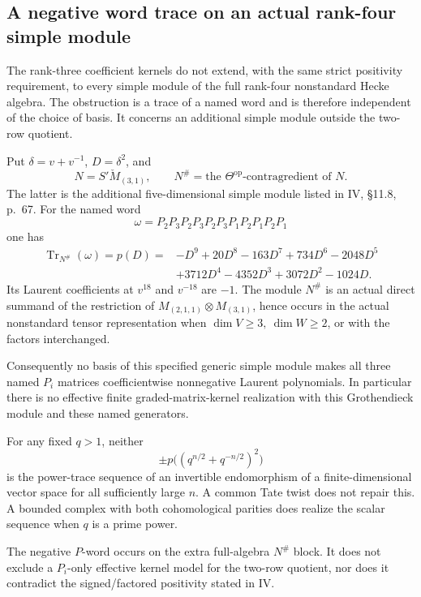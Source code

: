 \subsection{A negative word trace on an actual rank-four simple module}
The rank-three coefficient kernels do not extend, with the same
strict positivity requirement, to every simple module of the full
rank-four nonstandard Hecke algebra. The obstruction is a trace of
a named word and is therefore independent of the choice of basis.
It concerns an additional simple module outside the two-row quotient.

\begin{finding}
\label{f:rankfournegativetrace}
Put \(\delta=v+v^{-1}\), \(D=\delta^2\), and
\[
 N=S'\check M_{(3,1)},\qquad
 N^\#=\text{the }\Theta^{\mathrm{op}}\text{-contragredient of }N.
\]
The latter is the additional five-dimensional simple module listed
in IV, \S11.8, p.~67. For the named word
\[
 \omega=P_2P_3P_2P_3P_2P_3P_1P_2P_1P_2P_1
\]
one has
\begin{equation}\label{eq:rankfournegativepolynomial}
\begin{split}
 \operatorname{Tr}_{N^\#}(\omega)=p(D)
 ={}&-D^9+20D^8-163D^7+734D^6-2048D^5\\
    &+3712D^4-4352D^3+3072D^2-1024D.
\end{split}
\end{equation}
Its Laurent coefficients at \(v^{18}\) and \(v^{-18}\) are \(-1\).
The module \(N^\#\) is an actual direct summand of the restriction
of \(M_{(2,1,1)}\otimes M_{(3,1)}\), hence occurs in the actual
nonstandard tensor representation when
\(\dim V\ge3,\ \dim W\ge2\), or with the factors interchanged.

Consequently no basis of this specified generic simple module
makes all three named \(P_i\) matrices coefficientwise nonnegative
Laurent polynomials. In particular there is no effective finite
graded-matrix-kernel realization with this Grothendieck module
and these named generators.

For any fixed \(q>1\), neither
\[
 \pm p\big((q^{n/2}+q^{-n/2})^2\big)
\]
is the power-trace sequence of an invertible endomorphism of a
finite-dimensional vector space for all sufficiently large \(n\).
A common Tate twist does not repair this. A bounded complex
with both cohomological parities does realize the scalar sequence
when \(q\) is a prime power.

The negative \(P\)-word occurs on the extra full-algebra
\(N^\#\) block. It does not exclude a \(P_i\)-only effective
kernel model for the two-row quotient, nor does it contradict
the signed/factored positivity stated in IV.
\end{finding}


